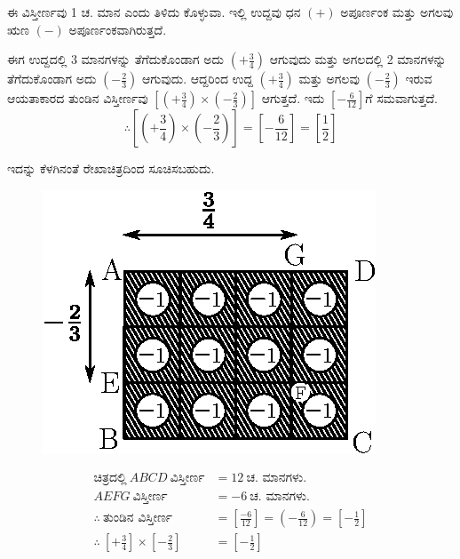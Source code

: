 ಈ ವಿಸ್ತೀರ್ಣವು 1 ಚ. ಮಾನ ಎಂದು ತಿಳಿದು ಕೊಳ್ಳುವಾ. ಇಲ್ಲಿ ಉದ್ದವು ಧನ $(+)$ ಅಪೂರ್ಣಂಕ ಮತ್ತು ಅಗಲವು ಋಣ $(-)$ ಅಪೂರ್ಣಂಕವಾಗಿರುತ್ತದೆ.

ಈಗ ಉದ್ದದಲ್ಲಿ 3 ಮಾನಗಳನ್ನು ತೆಗೆದುಕೊಂಡಾಗ ಅದು $\left(+\frac{3}{4} \right)$ ಆಗುವುದು ಮತ್ತು ಅಗಲದಲ್ಲಿ 2 ಮಾನಗಳನ್ನು ತೆಗೆದುಕೊಂಡಾಗ ಅದು $\left(-\frac{2}{3} \right)$ ಆಗುವುದು. ಆದ್ದರಿಂದ ಉದ್ದ $\left(+\frac{3}{4} \right)$ ಮತ್ತು ಅಗಲವು $\left(-\frac{2}{3} \right)$ ಇರುವ ಆಯತಾಕಾರದ ತುಂಡಿನ ವಿಸ್ತೀರ್ಣವು $\left[\left(+\frac{3}{4} \right) \times \left(-\frac{2}{3} \right)\right]$ ಆಗುತ್ತದೆ. ಇದು $\left[-\frac{6}{12}\right]$ಗೆ ಸಮವಾಗುತ್ತದೆ.
$$
\therefore \left[\left(+\frac{3}{4}\right) \times \left(-\frac{2}{3}\right)\right] = \left[-\frac{6}{12}\right] = \left[\frac{1}{2} \right]
$$

ಇದನ್ನು ಕೆಳಗಿನಂತೆ ರೇಖಾಚಿತ್ರದಿಂದ ಸೂಚಿಸಬಹುದು. 

\vspace{-.2cm}

\begin{figure}[H]
\centering
\includegraphics[scale=0.8]{src/figure/chap3/fig3-25b.eps}
\end{figure}

\vspace{-.4cm}

\begin{align*}
\text{ಚಿತ್ರದಲ್ಲಿ}~ ABCD ~\text{ವಿಸ್ತೀರ್ಣ} & = 12~ \text{ಚ. ಮಾನಗಳು.}\\
AEFG~ \text{ವಿಸ್ತೀರ್ಣ} & = -6~ \text{ಚ. ಮಾನಗಳು.}\\
\therefore~ \text{ತುಂಡಿನ ವಿಸ್ತೀರ್ಣ} &  = \left[\frac{-6}{12}\right] = \left(-\frac{6}{12} \right)=\left[-\frac{1}{2}\right]\\
\therefore~ \left[+ \frac{3}{4}\right] \times \left[-\frac{2}{3}\right] & = \left[- \frac{1}{2}\right]
\end{align*}

